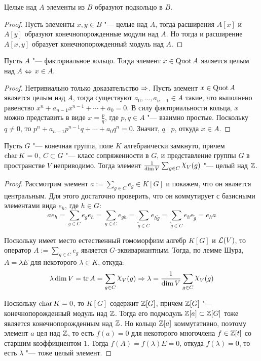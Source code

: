 \begin{corollary}
	Целые над $A$ элементы из $B$ образуют подкольцо в $B$.
\end{corollary}

\begin{proof}
	Пусть элементы $x, y \in B$ "--- целые над $A$, тогда расширения $A[x]$ и $A[y]$ образуют конечнопорожденные модули над $A$. Но тогда и расширение $A[x, y]$ образует конечнопорожденный модуль над $A$.
\end{proof}

\begin{proposition}
	Пусть $A$ "--- факториальное кольцо. Тогда элемент $x \in \operatorname{Quot}{A}$ является целым над $A$ $\Leftrightarrow$ $x \in A$.
\end{proposition}

\begin{proof}
	Нетривиально только доказательство $\Rightarrow$. Пусть элемент $x \in \operatorname{Quot}{A}$ является целым над $A$, тогда существуют $a_0, \dotsc, a_{n-1} \in A$ такие, что выполнено равенство $x^n + a_{n-1}x^{n-1} + \dotsb + a_0 = 0$. В силу факториальности кольца, $x$ можно представить в виде $x = \frac pq$, где $p, q \in A$ "--- взаимно простые. Поскольку $q \ne 0$, то $p^n + a_{n-1}{p^{n- 1}}q + \dotsb + a_0q^n = 0$. Значит, $q \mid p$, откуда $x \in A$.
\end{proof}

\begin{proposition}
	Пусть $G$ "--- конечная группа, поле $K$ алгебраически замкнуто, причем $\operatorname{char}{K} = 0$, $C \subset G$ "--- класс сопряженности в $G$, и представление группы $G$ в пространстве $V$ неприводимо. Тогда элемент $\frac1{\dim{V}}\sum_{g \in C}\Chi_V(g)$ "--- целый над $\mathbb{Z}$.
\end{proposition}

\begin{proof}
	Рассмотрим элемент $a := \sum_{g \in C}e_g \in K[G]$ и покажем, что он является центральным. Для этого достаточно проверить, что он коммутирует с базисными элементами вида $e_h$, где $h \in G$:
	\[ae_h = \sum_{g \in C}e_ge_h = \sum_{g \in C}e_{gh} = \sum_{\widetilde g \in C}e_{h\widetilde g} = \sum_{\widetilde g \in C}e_{h}e_{\widetilde g} = e_ha\]
	
	Поскольку имеет место естественный гомоморфизм алгебр $K[G]$ и $\mathcal L(V)$, то оператор $A := \sum_{g \in C}{e_g}$ является $G$-эквивариантным. Тогда, по лемме Шура, $A = \lambda E$ для некоторого $\lambda \in K$, откуда:
	\[\lambda\dim{V} = \tr{A} = \sum_{g \in C}\Chi_V(g) \ra \lambda = \frac1{\dim{V}}\sum_{g \in C}\Chi_V(g)\]
	
	Поскольку $\operatorname{char}{K} = 0$, то $K[G]$ содержит $\mathbb{Z}[G]$, причем $\mathbb{Z}[G]$ "--- конечнопорожденный модуль над $\mathbb{Z}$. Тогда его подмодуль $\mathbb{Z}[a] \subset \mathbb{Z}[G]$ тоже является конечнопорожденным над $\mathbb{Z}$. Но кольцо $\mathbb{Z}[a]$ коммутативно, поэтому элемент $a$ цел над $\mathbb{Z}$, то есть $f(a) = 0$ для некоторого многочлена $f \in \mathbb{Z}[t]$ со старшим коэффициентом $1$. Тогда $f(A) = f(\lambda)E = 0$, откуда $f(\lambda) = 0$, то есть $\lambda$ "--- тоже целый элемент.
\end{proof}

